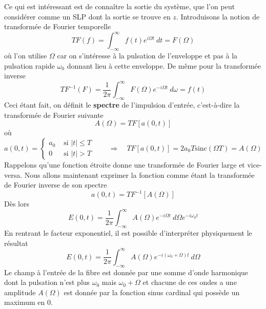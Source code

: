 Ce qui est intéressant est de connaître la sortie du système, que l'on peut considérer comme 
un SLP dont la sortie se trouve en $z$. Introduisons la notion de transformée de Fourier 
temporelle
\begin{equation}
TF(f) = \int_{-\infty}^\infty f(t)e^{i\Omega t}\ dt = F(\Omega)
\end{equation} 
où l'on utilise $\Omega$ car on s'intéresse à la pulsation de l'enveloppe et pas à la 
pulsation rapide $\omega_0$ donnant lieu à cette enveloppe. De même pour la transformée 
inverse
\begin{equation}
TF^{-1}(F) = \dfrac{1}{2\pi}\int_{-\infty}^\infty F(\Omega)e^{-i\Omega t }\ d\omega = f(t)
\end{equation}
Ceci étant fait, on définit le \textbf{spectre} de l'impulsion d'entrée, c'est-à-dire la 
transformée de Fourier suivante
\begin{equation}
A(\Omega) = TF[a(0,t)]
\end{equation}
où
\begin{equation}
a(0,t) = \left\{\begin{array}{ll}
a_0 & \text{ si } |t| \leq T\\
0 & \text{ si } |t| > T
\end{array}\right.\qquad \Rightarrow \quad TF[a(0,t)] = 2a_0T\text{sinc}(\Omega T) = A(\Omega)
\end{equation}
Rappelons qu'une fonction étroite donne une transformée de Fourier large et vice-versa. Nous 
allons maintenant exprimer la fonction comme étant la transformée de Fourier inverse de son 
spectre
\begin{equation}
a(0,t) = TF^{-1}[A(\Omega)]
\end{equation}
Dès lors
\begin{equation}
E(0,t) = \dfrac{1}{2\pi}\int_{-\infty}^\infty A(\Omega)e^{-i\Omega t}\ d\Omega e^{-i\omega_0t}
\end{equation}
En rentrant le facteur exponentiel, il est possible d’interpréter physiquement le résultat
\begin{equation}
E(0,t) = \dfrac{1}{2\pi}\int_{-\infty}^\infty A(\Omega)e^{-i(\omega_0 +\Omega)t}\ d\Omega 
\end{equation}
Le champ à l'entrée de la fibre est donnée par une somme d'onde harmonique dont la pulsation 
n'est plus $\omega_0$ mais $\omega_0+\Omega$ et chacune de ces ondes a une amplitude $A(\Omega)$ 
est donnée par la fonction sinus cardinal qui possède un maximum en $0$.\\

